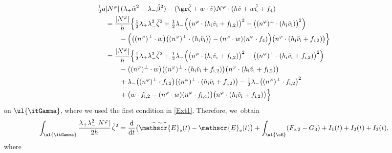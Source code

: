 \begin{align*}
\tfrac12a&|N^\varphi|\,(\lambda_+\check{\alpha}^2-\lambda_-\check{\beta}^2)
- (\gr\check{\zeta}+w\cdot\check{v})N^\varphi\cdot(h\check{v}+w\check{\zeta}+f_4) \\
&= \frac{|N^\varphi|}{h}\Bigl\{ \tfrac12\lambda_+\lambda_-^2\check{\zeta}^2
+ \tfrac12\lambda_-\Bigl(\bigl(n^\varphi\cdot(h_\mathrm{i}\check{v}_\mathrm{i}+f_{{\rm i},2}) \bigr)^2 - \bigl((n^\varphi)^\perp\cdot(h_\mathrm{i}\check{v}_\mathrm{i}) \bigr)^2 \Bigr) \\
&\qquad
- \Bigl(\bigl((n^\varphi)^\perp\cdot w \bigr) \bigl((n^\varphi)^\perp\cdot(h_\mathrm{i}\check{v}_\mathrm{i}) \bigr)
- (n^\varphi\cdot w)(n^\varphi\cdot f_4) \Bigr) \bigl(n^\varphi\cdot(h_\mathrm{i}\check{v}_\mathrm{i}+f_{{\rm i},2}) \bigr) \Bigr\} \\
&= \frac{|N^\varphi|}{h}\Bigl\{ \tfrac12\lambda_+\lambda_-^2\check{\zeta}^2
+ \tfrac12\lambda_-\Bigl(\bigl(n^\varphi\cdot(h_\mathrm{i}\check{v}_\mathrm{i}+f_{{\rm i},2}) \bigr)^2
- \bigl((n^\varphi)^\perp\cdot(h_\mathrm{i}\check{v}_\mathrm{i}+f_{{\rm i},2}) \bigr)^2 \Bigr) \\
&\qquad
- \bigl((n^\varphi)^\perp\cdot w \bigr) \bigl((n^\varphi)^\perp\cdot(h_\mathrm{i}\check{v}_\mathrm{i}+f_{{\rm i},2}) \bigr) \bigl(n^\varphi\cdot(h_\mathrm{i}\check{v}_\mathrm{i}+f_{{\rm i},2}) \bigr) \\
&\qquad
+ \lambda_- \bigl((n^\varphi)^\perp\cdot f_{{\rm i},2} \bigr) \bigl((n^\varphi)^\perp\cdot(h_\mathrm{i}\check{v}_\mathrm{i}+f_{{\rm i},2}) \bigr)
- \tfrac12\lambda_- \bigl((n^\varphi)^\perp\cdot f_{{\rm i},2} \bigr)^2 \\
&\qquad
+ \bigl(w\cdot f_{{\rm i},2} - (n^\varphi\cdot w)(n^\varphi\cdot f_{{\rm i},4}) \bigr) \bigl(n^\varphi\cdot(h_\mathrm{i}\check{v}_\mathrm{i}+f_{{\rm i},2}) \bigr) \Bigr\}
\end{align*}
on $\ul{\itGamma}$, where we used the first condition in \eqref{Ext1}.
Therefore, we~obtain
\begin{equation}\label{EqCF6}
\int_{\ul{\itGamma}}\frac{\lambda_+\lambda_-^2|N^\varphi|}{2h}\,\check{\zeta}^2
= \frac{\rm d}{{\rm d}t} \bigl(\widetilde{\mathscr{E}}_\mathrm{e}(t)-\mathscr{E}_\mathrm{e}(t) \bigr) + \int_{\ul{\cE}}(F_{{\rm e},2}-G_3) + I_1(t) + I_2(t) + I_3(t),
\end{equation}
where
